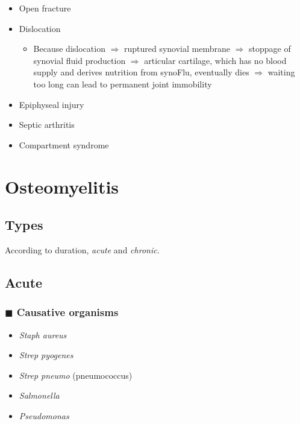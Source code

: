 \documentclass[
  12pt,
]{memoir}
\providecommand{\tightlist}{%
  \setlength{\itemsep}{0pt}\setlength{\parskip}{0pt}}
\begin{document}
\begin{itemize}
\tightlist
\item
  Open fracture
\item
  Dislocation

  \begin{itemize}
  \tightlist
  \item
    Because dislocation \(\Rightarrow\) ruptured synovial membrane
    \(\Rightarrow\) stoppage of synovial fluid production
    \(\Rightarrow\) articular cartilage, which has no blood supply and
    derives nutrition from synoFlu, eventually dies \(\Rightarrow\)
    waiting too long can lead to permanent joint immobility
  \end{itemize}
\item
  Epiphyseal injury
\item
  Septic arthritis
\item
  Compartment syndrome
\end{itemize}

\pagebreak

\hypertarget{osteomyelitis}{%
\section{Osteomyelitis}\label{osteomyelitis}}

\hypertarget{types-2}{%
\subsection{Types}\label{types-2}}

According to duration, \emph{acute} and \emph{chronic}.

\hypertarget{acute}{%
\subsection{Acute}\label{acute}}

\hypertarget{blacksquare-causative-organisms}{%
\subsubsection{\texorpdfstring{\(\blacksquare\) Causative
organisms}{\textbackslash blacksquare Causative organisms}}\label{blacksquare-causative-organisms}}

\begin{itemize}
\tightlist
\item
  \emph{Staph aureus}
\item
  \emph{Strep pyogenes}
\item
  \emph{Strep pneumo} (pneumococcus)
\item
  \emph{Salmonella}
\item
  \emph{Pseudomonas}
\end{itemize}
\end{document}
